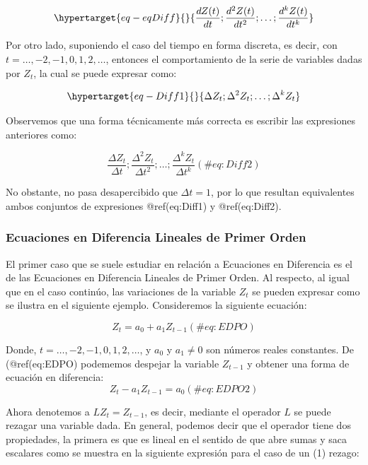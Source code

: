 \documentclass[
  a4paper,
]{article}
\begin{document}
\begin{equation}\protect\hypertarget{eq-eqDiff}{}{
    \frac{dZ(t)}{dt}; \frac{d^2Z(t)}{dt^2}; \ldots; \frac{d^kZ(t)}{dt^k}
}\label{eq-eqDiff}\end{equation}

Por otro lado, suponiendo el caso del tiempo en forma discreta, es
decir, con \(t = \ldots, -2, -1, 0, 1, 2, \ldots\), entonces el
comportamiento de la serie de variables dadas por \(Z_t\), la cual se
puede expresar como:

\begin{equation}\protect\hypertarget{eq-Diff1}{}{
    \Delta Z_t; \Delta^2 Z_t; \ldots; \Delta^k Z_t
}\label{eq-Diff1}\end{equation}

Observemos que una forma técnicamente más correcta es escribir las
expresiones anteriores como:

\[
    \frac{\Delta Z_t}{\Delta t}; \frac{\Delta^2 Z_t}{\Delta t^2}; \ldots; \frac{\Delta^k Z_t}{\Delta t^k}
    (\#eq:Diff2)
\]

No obstante, no pasa desapercibido que \(\Delta t = 1\), por lo que
resultan equivalentes ambos conjuntos de expresiones @ref(eq:Diff1) y
@ref(eq:Diff2).

\hypertarget{ecuaciones-en-diferencia-lineales-de-primer-orden}{%
\subsubsection{Ecuaciones en Diferencia Lineales de Primer
Orden}\label{ecuaciones-en-diferencia-lineales-de-primer-orden}}

El primer caso que se suele estudiar en relación a Ecuaciones en
Diferencia es el de las Ecuaciones en Diferencia Lineales de Primer
Orden. Al respecto, al igual que en el caso continúo, las variaciones de
la variable \(Z_t\) se pueden expresar como se ilustra en el siguiente
ejemplo. Consideremos la siguiente ecuación:

\[
    Z_t = a_0 + a_1 Z_{t-1}
    (\#eq:EDPO)
\]

Donde, \(t = \ldots, -2, -1, 0, 1, 2, \ldots\), y \(a_0\) y
\(a_1 \neq 0\) son números reales constantes. De (@ref(eq:EDPO)
podememos despejar la variable \(Z_{t-1}\) y obtener una forma de
ecuación en diferencia: \[
    Z_t - a_1 Z_{t-1} = a_0
    (\#eq:EDPO2)
\]

Ahora denotemos a \(L Z_t = Z_{t-1}\), es decir, mediante el operador
\(L\) se puede rezagar una variable dada. En general, podemos decir que
el operador tiene dos propiedades, la primera es que es lineal en el
sentido de que abre sumas y saca escalares como se muestra en la
siguiente expresión para el caso de un (1) rezago:
\end{document}
